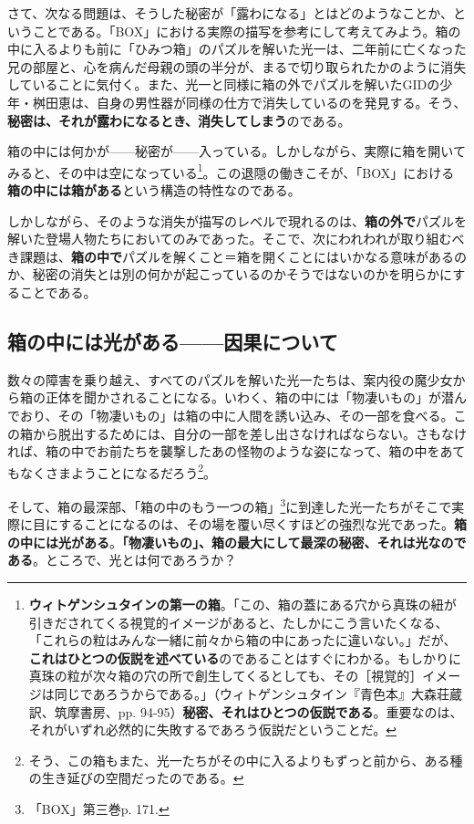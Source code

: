 \documentclass[a4paper]{jsarticle}
\begin{document}
さて、次なる問題は、そうした秘密が「露わになる」とはどのようなことか、ということである。「BOX」における実際の描写を参考にして考えてみよう。箱の中に入るよりも前に「ひみつ箱」のパズルを解いた光一は、二年前に亡くなった兄の部屋と、心を病んだ母親の頭の半分が、まるで切り取られたかのように消失していることに気付く。また、光一と同様に箱の外でパズルを解いたGIDの少年・桝田恵は、自身の男性器が同様の仕方で消失しているのを発見する。そう、\textbf{秘密は、それが露わになるとき、消失してしまう}のである。

箱の中には何かが------秘密が------入っている。しかしながら、実際に箱を開いてみると、その中は空になっている\footnote{\textbf{ウィトゲンシュタインの第一の箱}。「この、箱の蓋にある穴から真珠の紐が引きだされてくる視覚的イメージがあると、たしかにこう言いたくなる、「これらの粒はみんな一緒に前々から箱の中にあったに違いない。」だが、\textbf{これはひとつの仮説を述べている}のであることはすぐにわかる。もしかりに真珠の粒が次々箱の穴の所で創生してくるとしても、その［視覚的］イメージは同じであろうからである。」（ウィトゲンシュタイン『青色本』大森荘蔵訳、筑摩書房、pp. 94-95）\textbf{秘密、それはひとつの仮説である}。重要なのは、それがいずれ必然的に失敗するであろう仮説だということだ。}。この退隠の働きこそが、「BOX」における\textbf{箱の中には箱がある}という構造の特性なのである。

しかしながら、そのような消失が描写のレベルで現れるのは、\textbf{箱の外で}パズルを解いた登場人物たちにおいてのみであった。そこで、次にわれわれが取り組むべき課題は、\textbf{箱の中で}パズルを解くこと＝箱を開くことにはいかなる意味があるのか、秘密の消失とは別の何かが起こっているのかそうではないのかを明らかにすることである。

\subsection{箱の中には光がある------因果について}

数々の障害を乗り越え、すべてのパズルを解いた光一たちは、案内役の魔少女から箱の正体を聞かされることになる。いわく、箱の中には「物凄いもの」が潜んでおり、その「物凄いもの」は箱の中に人間を誘い込み、その一部を食べる。この箱から脱出するためには、自分の一部を差し出さなければならない。さもなければ、箱の中でお前たちを襲撃したあの怪物のような姿になって、箱の中をあてもなくさまようことになるだろう\footnote{そう、この箱もまた、光一たちがその中に入るよりもずっと前から、ある種の生き延びの空間だったのである。}。

そして、箱の最深部、「箱の中のもう一つの箱」\footnote{「BOX」第三巻p. 171.}に到達した光一たちがそこで実際に目にすることになるのは、その場を覆い尽くすほどの強烈な光であった。\textbf{箱の中には光がある}。\textbf{「物凄いもの」、箱の最大にして最深の秘密、それは光なのである}。ところで、光とは何であろうか？
\end{document}
